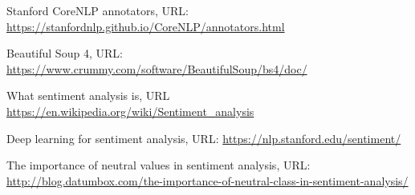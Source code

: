 \documentclass[a4paper]{article}
\begin{document}
\begin{thebibliography}{9}
Stanford CoreNLP annotators, URL: \url{https://stanfordnlp.github.io/CoreNLP/annotators.html}

Beautiful Soup 4, URL: \url{https://www.crummy.com/software/BeautifulSoup/bs4/doc/}

What sentiment analysis is, URL \url{https://en.wikipedia.org/wiki/Sentiment_analysis}

Deep learning for sentiment analysis, URL: \url{https://nlp.stanford.edu/sentiment/}

The importance of neutral values in sentiment analysis, URL: \url{http://blog.datumbox.com/the-importance-of-neutral-class-in-sentiment-analysis/}

\end{thebibliography}
\end{document}

